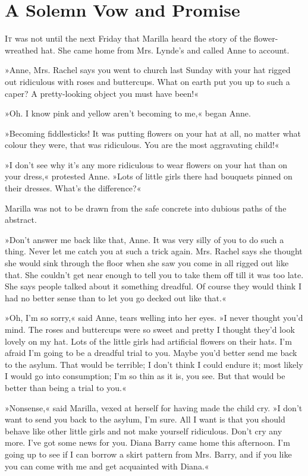 \chapter{A Solemn Vow and Promise}

\lettrine[lines=4]{I}{t} was not until the next Friday that Marilla heard the story of the flower-wreathed hat. She came home from Mrs. Lynde’s and called Anne to account.

\zz
»Anne, Mrs. Rachel says you went to church last Sunday with your hat rigged out ridiculous with roses and buttercups. What on earth put you up to such a caper? A pretty-looking object you must have been!«

»Oh. I know pink and yellow aren’t becoming to me,« began Anne.

»Becoming fiddlesticks! It was putting flowers on your hat at all, no matter what colour they were, that was ridiculous. You are the most aggravating child!«

»I don’t see why it’s any more ridiculous to wear flowers on your hat than on your dress,« protested Anne. »Lots of little girls there had bouquets pinned on their dresses. What’s the difference?«

Marilla was not to be drawn from the safe concrete into dubious paths of the abstract.

»Don’t answer me back like that, Anne. It was very silly of you to do such a thing. Never let me catch you at such a trick again. Mrs. Rachel says she thought she would sink through the floor when she saw you come in all rigged out like that. She couldn’t get near enough to tell you to take them off till it was too late. She says people talked about it something dreadful. Of course they would think I had no better sense than to let you go decked out like that.«

»Oh, I’m so sorry,« said Anne, tears welling into her eyes. »I never thought you’d mind. The roses and buttercups were so sweet and pretty I thought they’d look lovely on my hat. Lots of the little girls had artificial flowers on their hats. I’m afraid I’m going to be a dreadful trial to you. Maybe you’d better send me back to the asylum. That would be terrible; I don’t think I could endure it; most likely I would go into consumption; I’m so thin as it is, you see. But that would be better than being a trial to you.«

»Nonsense,« said Marilla, vexed at herself for having made the child cry. »I don’t want to send you back to the asylum, I’m sure. All I want is that you should behave like other little girls and not make yourself ridiculous. Don’t cry any more. I’ve got some news for you. Diana Barry came home this afternoon. I’m going up to see if I can borrow a skirt pattern from Mrs. Barry, and if you like you can come with me and get acquainted with Diana.«

